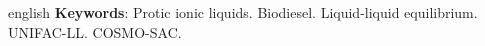 \begin{resumo}[Abstract]
\begin{otherlanguage*}{english}
\vspace{\onelineskip}
\noindent
\textbf{Keywords}: Protic ionic liquids. Biodiesel. Liquid-liquid equilibrium. UNIFAC-LL. COSMO-SAC.
 
\end{otherlanguage*}
\end{resumo}